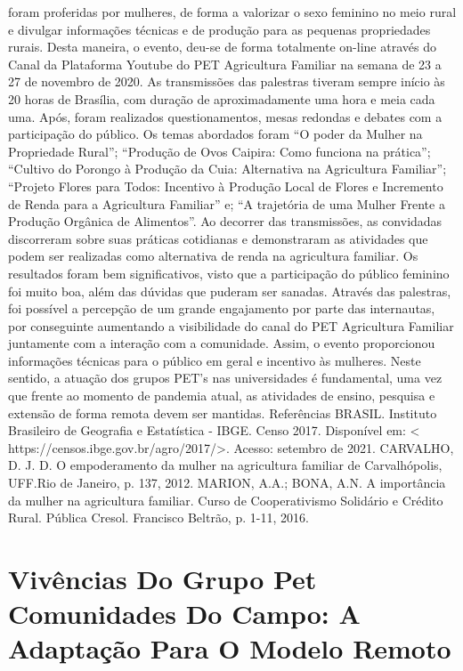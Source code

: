 foram proferidas por mulheres, de forma a valorizar o sexo feminino no meio rural e divulgar 
informações técnicas e de produção para as pequenas propriedades rurais. Desta maneira, o evento, 
deu-se de forma totalmente on-line através do Canal da Plataforma Youtube do PET Agricultura 
Familiar na semana de 23 a 27 de novembro de 2020. As transmissões das palestras tiveram sempre 
início às 20 horas de Brasília, com duração de aproximadamente uma hora e meia cada uma. Após, 
foram realizados questionamentos, mesas redondas e debates com a participação do público. 
Os temas abordados foram “O poder da Mulher na Propriedade Rural”; “Produção de Ovos 
Caipira: Como funciona na prática”; “Cultivo do Porongo à Produção da Cuia: Alternativa na 
Agricultura Familiar”; “Projeto Flores para Todos: Incentivo à Produção Local de Flores e 
Incremento de Renda para a Agricultura Familiar” e; “A trajetória de uma Mulher Frente a 
Produção Orgânica de Alimentos”.
Ao decorrer das transmissões, as convidadas discorreram sobre suas práticas cotidianas e 
demonstraram as atividades que podem ser realizadas como alternativa de renda na agricultura 
familiar. Os resultados foram bem significativos, visto que a participação do público feminino foi 
muito boa, além das dúvidas que puderam ser sanadas. Através das palestras, foi possível a 
percepção de um grande engajamento por parte das internautas, por conseguinte aumentando a 
visibilidade do canal do PET Agricultura Familiar juntamente com a interação com a comunidade.
Assim, o evento proporcionou informações técnicas para o público em geral e incentivo 
às mulheres. Neste sentido, a atuação dos grupos PET’s nas universidades é fundamental, uma 
vez que frente ao momento de pandemia atual, as atividades de ensino, pesquisa e extensão de 
forma remota devem ser mantidas.
Referências 
BRASIL. Instituto Brasileiro de Geografia e Estatística - IBGE. Censo 2017. Disponível em: <
https://censos.ibge.gov.br/agro/2017/>. Acesso: setembro de 2021.
CARVALHO, D. J. D. O empoderamento da mulher na agricultura familiar de Carvalhópolis, 
UFF.Rio de Janeiro, p. 137, 2012.
MARION, A.A.; BONA, A.N. A importância da mulher na agricultura familiar. Curso de 
Cooperativismo Solidário e Crédito Rural. Pública Cresol. Francisco Beltrão, p. 1-11, 2016.




\section*{Vivências Do Grupo Pet Comunidades Do Campo: A Adaptação Para O Modelo Remoto }

